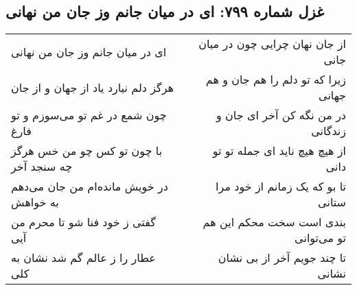 \begin{center}
\section*{غزل شماره ۷۹۹: ای در میان جانم وز جان من نهانی}
\label{sec:799}
\begin{longtable}{l p{0.5cm} r}
ای در میان جانم وز جان من نهانی
&&
از جان نهان چرایی چون در میان جانی
\\
هرگز دلم نیارد یاد از جهان و از جان
&&
زیرا که تو دلم را هم جان و هم جهانی
\\
چون شمع در غم تو می‌سوزم و تو فارغ
&&
در من نگه کن آخر ای جان و زندگانی
\\
با چون تو کس چو من خس هرگز چه سنجد آخر
&&
از هیچ هیچ ناید ای جمله تو تو دانی
\\
در خویش مانده‌ام من جان می‌دهم به خواهش
&&
تا بو که یک زمانم از خود مرا ستانی
\\
گفتی ز خود فنا شو تا محرم من آیی
&&
بندی است سخت محکم این هم تو می‌توانی
\\
عطار را ز عالم گم شد نشان به کلی
&&
تا چند جویم آخر از بی نشان نشانی
\\
\end{longtable}
\end{center}
